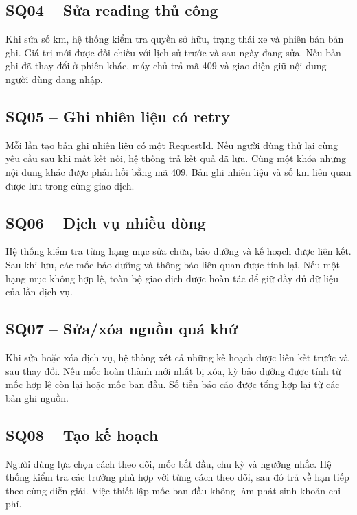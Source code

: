 \subsection{SQ04 -- Sửa reading thủ công}
Khi sửa số km, hệ thống kiểm tra quyền sở hữu, trạng thái xe và phiên bản bản ghi. Giá trị mới được đối chiếu với lịch sử trước và sau ngày đang sửa. Nếu bản ghi đã thay đổi ở phiên khác, máy chủ trả mã 409 và giao diện giữ nội dung người dùng đang nhập.

\subsection{SQ05 -- Ghi nhiên liệu có retry}
Mỗi lần tạo bản ghi nhiên liệu có một RequestId. Nếu người dùng thử lại cùng yêu cầu sau khi mất kết nối, hệ thống trả kết quả đã lưu. Cùng một khóa nhưng nội dung khác được phản hồi bằng mã 409. Bản ghi nhiên liệu và số km liên quan được lưu trong cùng giao dịch.

\subsection{SQ06 -- Dịch vụ nhiều dòng}
Hệ thống kiểm tra từng hạng mục sửa chữa, bảo dưỡng và kế hoạch được liên kết. Sau khi lưu, các mốc bảo dưỡng và thông báo liên quan được tính lại. Nếu một hạng mục không hợp lệ, toàn bộ giao dịch được hoàn tác để giữ đầy đủ dữ liệu của lần dịch vụ.

\subsection{SQ07 -- Sửa/xóa nguồn quá khứ}
Khi sửa hoặc xóa dịch vụ, hệ thống xét cả những kế hoạch được liên kết trước và sau thay đổi. Nếu mốc hoàn thành mới nhất bị xóa, kỳ bảo dưỡng được tính từ mốc hợp lệ còn lại hoặc mốc ban đầu. Số tiền báo cáo được tổng hợp lại từ các bản ghi nguồn.

\subsection{SQ08 -- Tạo kế hoạch}
Người dùng lựa chọn cách theo dõi, mốc bắt đầu, chu kỳ và ngưỡng nhắc. Hệ thống kiểm tra các trường phù hợp với từng cách theo dõi, sau đó trả về hạn tiếp theo cùng diễn giải. Việc thiết lập mốc ban đầu không làm phát sinh khoản chi phí.

